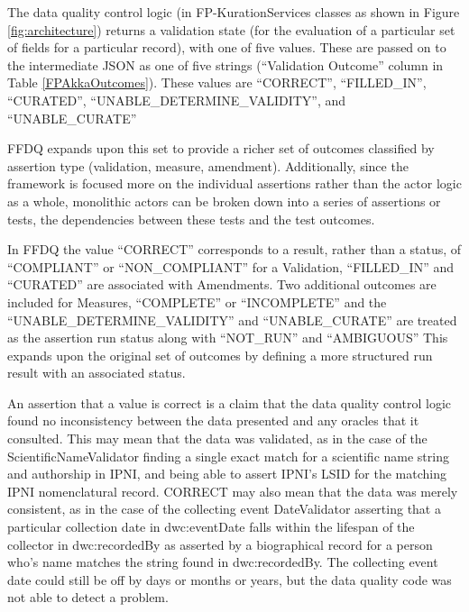 \documentclass{article}
\begin{document}
The data quality control logic (in FP-KurationServices classes as shown in Figure \ref{fig:architecture}) returns a validation state (for the evaluation of a particular set of fields for a particular record), with one of five values.  These are passed on to the intermediate JSON as one of five strings (``Validation Outcome'' column in Table \ref{FPAkkaOutcomes}).  These values are “CORRECT”, “FILLED\_IN”, “CURATED”, “UNABLE\_DETERMINE\_VALIDITY”, and “UNABLE\_CURATE”

FFDQ expands upon this set to provide a richer set of outcomes classified by assertion type (validation, measure, amendment). Additionally, since the framework is focused more on the individual assertions rather than the actor logic as a whole, monolithic actors can be broken down into a series of assertions or tests, the dependencies between these tests and the test outcomes.

In FFDQ the value ``CORRECT'' corresponds to a result, rather than a status, of ``COMPLIANT'' or ``NON\_COMPLIANT'' for a Validation, ``FILLED\_IN'' and ``CURATED'' are associated with Amendments. Two additional outcomes are included for Measures, ``COMPLETE'' or ``INCOMPLETE'' and the ``UNABLE\_DETERMINE\_VALIDITY'' and ``UNABLE\_CURATE'' are treated as the assertion run status along with ``NOT\_RUN'' and ``AMBIGUOUS'' This expands upon the original set of outcomes by defining a more structured run result with an associated status.


An assertion that a value is correct is a claim that the data quality control logic found no inconsistency between the data presented and any oracles that it consulted.  
This may mean that the data was validated, as in the case of the ScientificNameValidator finding a single exact match for a scientific name string and authorship in IPNI, and being able to assert IPNI's LSID for the matching IPNI nomenclatural record.
CORRECT may also mean that the data was merely consistent, as in the case of the collecting event DateValidator asserting that a particular collection date in dwc:eventDate falls within the lifespan of the collector in dwc:recordedBy as asserted by a biographical record for a person who's name matches the string found in dwc:recordedBy.  The collecting event date could still be off by days or months or years, but the data quality code was not able to detect a problem.
\end{document}
